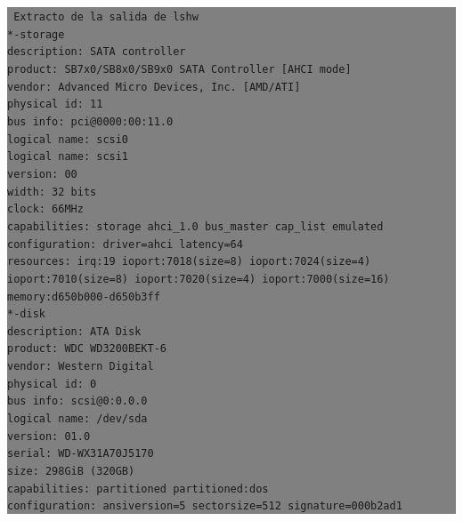 \documentclass[12pt]{article}
\begin{document}
\colorbox{grey}{\parbox[t]{0.95\linewidth}{ \vspace*{0.5cm} { 
{\tt
Extracto de la salida de \texttt{lshw}\\
        *-storage\\
             description: SATA controller\\
             product: SB7x0/SB8x0/SB9x0 SATA Controller [AHCI mode]\\
             vendor: Advanced Micro Devices, Inc. [AMD/ATI]\\
             physical id: 11\\
             bus info: pci@0000:00:11.0\\
             logical name: scsi0\\
             logical name: scsi1\\
             version: 00\\
             width: 32 bits\\
             clock: 66MHz\\
             capabilities: storage ahci\_1.0 bus\_master cap\_list emulated\\
             configuration: driver=ahci latency=64\\
             resources: irq:19 ioport:7018(size=8) ioport:7024(size=4) ioport:7010(size=8) ioport:7020(size=4) ioport:7000(size=16) memory:d650b000-d650b3ff\\
           *-disk\\
                description: ATA Disk\\
                product: WDC WD3200BEKT-6\\
                vendor: Western Digital\\
                physical id: 0\\
                bus info: scsi@0:0.0.0\\
                logical name: /dev/sda\\
                version: 01.0\\
                serial: WD-WX31A70J5170\\
                size: 298GiB (320GB)\\
                capabilities: partitioned partitioned:dos\\
                configuration: ansiversion=5 sectorsize=512 signature=000b2ad1\\
}
} \vspace*{0.5cm} } } 
\end{document}
